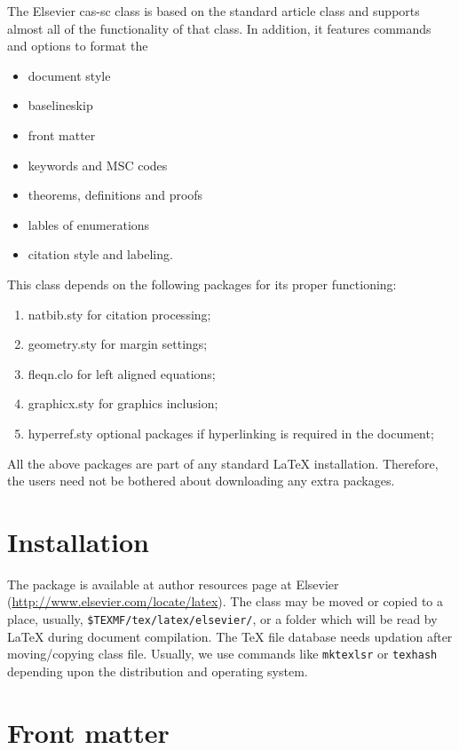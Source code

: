 \documentclass[a4paper,fleqn]{cas-sc}
\begin{document}
The Elsevier cas-sc class is based on the
standard article class and supports almost all of the functionality of
that class. In addition, it features commands and options to format the
\begin{itemize} \item document style \item baselineskip \item front
matter \item keywords and MSC codes \item theorems, definitions and
proofs \item lables of enumerations \item citation style and labeling.
\end{itemize}

This class depends on the following packages
for its proper functioning:

\begin{enumerate}
\itemsep=0pt
\item {natbib.sty} for citation processing;
\item {geometry.sty} for margin settings;
\item {fleqn.clo} for left aligned equations;
\item {graphicx.sty} for graphics inclusion;
\item {hyperref.sty} optional packages if hyperlinking is
  required in the document;
\end{enumerate}  

All the above packages are part of any
standard \LaTeX{} installation.
Therefore, the users need not be
bothered about downloading any extra packages.

\section{Installation}

The package is available at author resources page at Elsevier
(\url{http://www.elsevier.com/locate/latex}).
The class may be moved or copied to a place, usually,
\verb+$TEXMF/tex/latex/elsevier/+, %
or a folder which will be read                   
by \LaTeX{} during document compilation.  The \TeX{} file
database needs updation after moving/copying class file.  Usually,
we use commands like \verb+mktexlsr+ or \verb+texhash+ depending
upon the distribution and operating system.

\section{Front matter}
\end{document}
